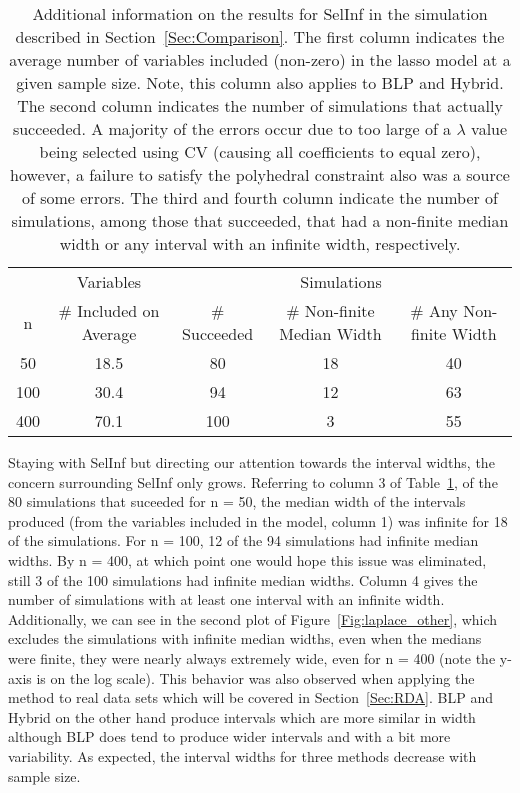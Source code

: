 \begin{table}[hb]
  \centering
  \begin{tabular}{ccccc}
  \hline
  & Variables & \multicolumn{3}{c}{Simulations} \\
  \cmidrule(lr){2-2}\cmidrule(lr){3-5}
  n & \# Included on Average & \# Succeeded & \# Non-finite Median Width & \# Any Non-finite Width \\
  \hline
  50 & 18.5 & 80 & 18 & 40 \\
  100 & 30.4 & 94 & 12 & 63 \\
  400 & 70.1 & 100 & 3 & 55 \\
  \hline
  \end{tabular}
  \caption{Additional information on the results for SelInf in the simulation described in Section~\ref{Sec:Comparison}. The first column indicates the average number of variables included (non-zero) in the lasso model at a given sample size. Note, this column also applies to BLP and Hybrid. The second column indicates the number of simulations that actually succeeded. A majority of the errors occur due to too large of a $\lambda$ value being selected using CV (causing all coefficients to equal zero), however, a failure to satisfy the polyhedral constraint also was a source of some errors. The third and fourth column indicate the number of simulations, among those that succeeded, that had a non-finite median width or any interval with an infinite width, respectively.}
  \label{Tab:selective_inference}
\end{table}

Staying with SelInf but directing our attention towards the interval widths, the concern surrounding SelInf only grows. Referring to column 3 of Table~\ref{Tab:selective_inference}, of the 80 simulations that suceeded for n = 50, the median width of the intervals produced (from the variables included in the model, column 1) was infinite for 18 of the simulations. For n = 100, 12 of the 94 simulations had infinite median widths. By n = 400, at which point one would hope this issue was eliminated, still 3 of the 100 simulations had infinite median widths. Column 4 gives the number of simulations with at least one interval with an infinite width. Additionally, we can see in the second plot of Figure~\ref{Fig:laplace_other}, which excludes the simulations with infinite median widths, even when the medians were finite, they were nearly always extremely wide, even for n = 400 (note the y-axis is on the log scale). This behavior was also observed when applying the method to real data sets which will be covered in Section~\ref{Sec:RDA}. BLP and Hybrid on the other hand produce intervals which are more similar in width although BLP does tend to produce wider intervals and with a bit more variability. As expected, the interval widths for three methods decrease with sample size.

